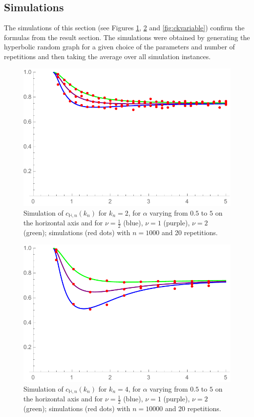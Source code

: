 \subsection{Simulations}\label{ssec:simulations}
The simulations of this section (see Figures \ref{fig:c2allnu}, \ref{fig:c4allnu} and \ref{fig:ckvariable}) confirm the formulas from the result section. The simulations were obtained by generating the hyperbolic random graph for a given choice of the parameters and number of repetitions and then taking the average over all simulation instances.
\begin{figure}
    \centering
    \includegraphics[scale=0.6]{figures/sim0123c2nualln1000rep20.pdf}
    \caption{Simulation of $c_{\mathbb{H},n}(k_n)$ for $k_n= 2$, for $\alpha$ varying from $0.5$ to $5$ on the horizontal axis and for $\nu=\frac{1}{2}$ (blue), $\nu=1$ (purple), $\nu=2$ (green); simulations (red dots) with $n=1000$ and 20 repetitions.}
    \label{fig:c2allnu}
\end{figure}
\begin{figure}
    \centering
    \includegraphics[scale=0.6]{figures/sim0128c4nualln10000rep20.pdf}
    \caption{Simulation of $c_{\mathbb{H},n}(k_n)$ for $k_n= 4$, for $\alpha$ varying from $0.5$ to $5$ on the horizontal axis and for $\nu=\frac{1}{2}$ (blue), $\nu=1$ (purple), $\nu=2$ (green); simulations (red dots) with $n=10 000$ and 20 repetitions.}
    \label{fig:c4allnu}
\end{figure}
